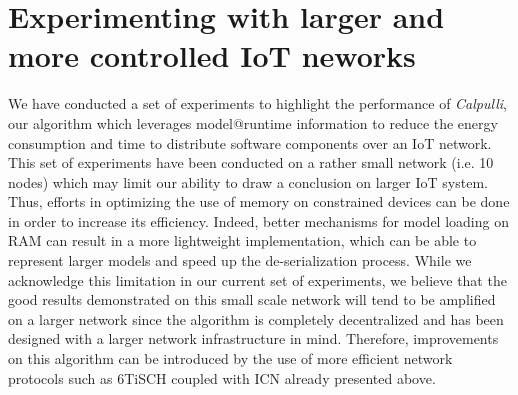 \section*{Experimenting with larger and more controlled IoT neworks}
We have conducted a set of experiments to highlight the performance of \textit{Calpulli}, our algorithm which leverages model@runtime information to reduce the energy consumption and time to distribute software components over an IoT network.
This set of experiments have been conducted on a rather small network (i.e. 10 nodes) which  may limit our ability to draw a conclusion on larger IoT system.
Thus, efforts in optimizing the use of memory on constrained devices can be done in order to increase its efficiency.
Indeed, better mechanisms for model loading on RAM can result in a more lightweight implementation, which can be able to represent larger models and speed up the de-serialization process.
While we acknowledge this limitation in our current set of experiments, we believe that the good results demonstrated on this small scale network will tend to be amplified on a larger network since the algorithm is completely decentralized and has been designed with a larger network infrastructure in mind.
Therefore, improvements on this algorithm can be introduced by the use of more efficient network protocols such as 6TiSCH\cite{dujovne20146tisch} coupled with ICN already presented above.